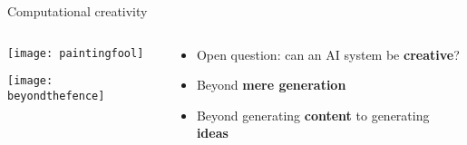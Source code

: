 \begin{frame}{Computational creativity}
	\begin{columns}
		\begin{column}{0.4\textwidth}
			\pause\texttt{[image: paintingfool]}
			
			\vspace{2ex}
			
			\pause\texttt{[image: beyondthefence]}
		\end{column}
		\begin{column}{0.55\textwidth}
			\begin{itemize}
				\pause\item Open question: can an AI system be \textbf{creative}?
				\pause\item Beyond \textbf{mere generation}
				\pause\item Beyond generating \textbf{content} to generating \textbf{ideas}
			\end{itemize}
		\end{column}
	\end{columns}
\end{frame}
